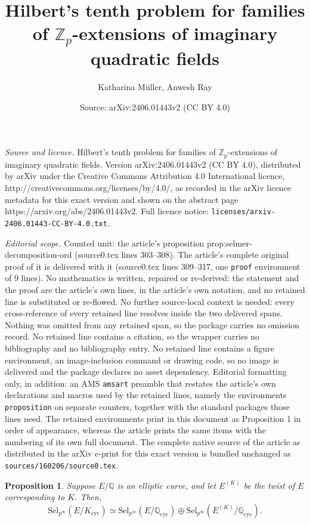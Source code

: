 \documentclass[10pt,a4paper]{amsart}
\title{Hilbert's tenth problem for families of $ \mathbb{Z}_p $-extensions of imaginary quadratic fields}
\author{Katharina M\"uller, Anwesh Ray}
\date{Source: arXiv:2406.01443v2 (CC BY 4.0)}
\newtheorem{proposition}{Proposition}
\begin{document}
\maketitle

\noindent\emph{Source and licence.} Hilbert's tenth problem for families of $ \mathbb{Z}_p $-extensions of imaginary quadratic fields. Version arXiv:2406.01443v2 (CC BY 4.0), distributed by arXiv under the Creative Commons Attribution 4.0 International licence, http://creativecommons.org/licenses/by/4.0/, as recorded in the arXiv licence metadata for this exact version and shown on the abstract page https://arxiv.org/abs/2406.01443v2. Full licence notice: \texttt{licenses/arxiv-2406.01443-CC-BY-4.0.txt}.\par\smallskip

\noindent\textit{Editorial scope.} Counted unit: the article's proposition prop:selmer-decomposition-ord (source0.tex lines 303--308). The article's complete original proof of it is delivered with it (source0.tex lines 309--317, one \texttt{proof} environment of 9 lines). No mathematics is written, repaired or re-derived: the statement and the proof are the article's own lines, in the article's own notation, and no retained line is substituted or re-flowed.  No further source-local context is needed: every cross-reference of every retained line resolves inside the two delivered spans.  Nothing was omitted from any retained span, so the package carries no omission record.  No retained line contains a citation, so the wrapper carries no bibliography and no bibliography entry.  No retained line contains a figure environment, an image-inclusion command or drawing code, so no image is delivered and the package declares no asset dependency.  Editorial formatting only, in addition: an AMS \texttt{amsart} preamble that restates the article's own declarations and macros used by the retained lines, namely the environments \texttt{proposition} on separate counters, together with the standard packages those lines need.  The retained environments print in this document as Proposition 1 in order of appearance, whereas the article prints the same items with the numbering of its own full document.  The complete native source of the article as distributed in the arXiv e-print for this exact version is bundled unchanged as \texttt{sources/160206/source0.tex}.
\begin{proposition}\label{prop:selmer-decomposition-ord}
    Suppose $ E/\mathbb{Q} $ is an elliptic curve, and let $ E^{(K)} $ be the twist of $ E $ corresponding to $ K $. Then,
    \[
    \mathrm{Sel}_{p^\infty}(E/K_{\mathrm{cyc}}) \simeq \mathrm{Sel}_{p^\infty}(E/\mathbb{Q}_{\mathrm{cyc}}) \oplus \mathrm{Sel}_{p^\infty}(E^{(K)}/\mathbb{Q}_{\mathrm{cyc}}).
    \]
\end{proposition}
\end{document}
